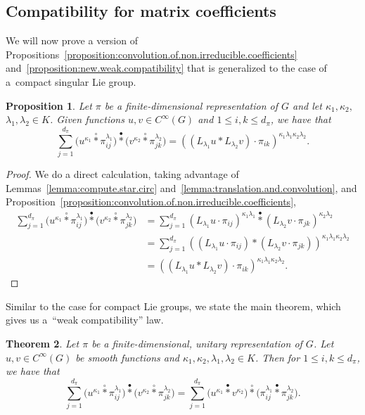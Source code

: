 \documentclass[10pt,a4paper]{amsart}
\numberwithin{equation}{section}
\newtheorem{Theorem}{Theorem}[section]
\newtheorem{Proposition}[Theorem]{Proposition}
\theoremstyle{definition}
\newcommand{\stardot}{\overset{{\bullet}}{*}}
\newcommand{\starcirc}{\overset{\circ}{*}}
\begin{document}
\subsection{Compatibility for matrix coefficients}
We will now prove a version of Propositions~\ref{proposition:convolution.of.non.irreducible.coefficients} and~\ref{proposition:new.weak.compatibility} that is generalized to the case of a~compact singular Lie group.
\begin{Proposition}\label{proposition:new.weak.compat}
   Let $ \pi $ be a finite-dimensional representation of $ G $ and let $ \kappa_1, \kappa_2,$ $\lambda_1, \lambda_2 \in K $. Given functions $ u, v \in C^\infty(G) $ and $ 1 \le i,k \le d_\pi $, we have that
  \[
   \sum_{j = 1}^{d_\pi} \big( u^{\kappa_1} \starcirc \pi_{ij}^{\lambda_1} \big) \stardot \big( v^{\kappa_2} \starcirc \pi_{jk}^{\lambda_2} \big) =  ( (L_{\lambda_1}u * L_{\lambda_2} v ) \cdot \pi_{ik} )^{\kappa_1 \lambda_1 \kappa_2 \lambda_2}.
  \]
\end{Proposition}
\begin{proof}
We do a direct calculation, taking advantage of Lemmas~\ref{lemma:compute.star.circ} and~\ref{lemma:translation.and.convolution}, and Proposition~\ref{proposition:convolution.of.non.irreducible.coefficients},
\begin{align*}
  \sum_{j = 1}^{d_\pi} \big( u^{\kappa_1} \starcirc \pi_{ij}^{\lambda_1} \big) \stardot \big( v^{\kappa_2} \starcirc \pi_{jk}^{\lambda_2} \big)
  &= \sum_{j = 1}^{d_\pi} ( L_{\lambda_1} u \cdot \pi_{ij})^{\kappa_1\lambda_1} \stardot ( L_{\lambda_2}
 v \cdot \pi_{jk} )^{\kappa_2 \lambda_2} \\
  &=\sum_{j=1}^{d_\pi} \left( (L_{\lambda_1} u \cdot \pi_{ij}) * (L_{\lambda_2} v \cdot \pi_{jk})\right)^{\kappa_1 \lambda_1 \kappa_2 \lambda_2} \\
  &= \left( (L_{\lambda_1} u * L_{\lambda_2} v ) \cdot \pi_{ik} \right)^{\kappa_1 \lambda_1 \kappa_2 \lambda_2 }.\tag*{\qed}
  \end{align*}\renewcommand{\qed}{}
\end{proof}

Similar to the case for compact Lie groups, we state the main theorem, which gives us a~``weak compatibility'' law.

\begin{Theorem}\label{theorem:new.main}
 Let $ \pi $ be a finite-dimensional, unitary representation of $ G $. Let $ u, v \in C^\infty(G) $ be smooth functions and $ \kappa_1, \kappa_2, \lambda_1, \lambda_2 \in K $. Then for
 $1 \le i,k \le d_{\pi} $, we have that
  \[
   \sum_{j = 1}^{d_\pi} \big( u^{\kappa_1} \starcirc \pi_{ij}^{\lambda_1} \big) \stardot \big( v^{\kappa_2} \starcirc \pi_{jk}^{\lambda_2} \big) =   \sum_{j = 1}^{d_\pi} \big( u^{\kappa_1} \stardot  v^{\kappa_2} \big) \starcirc \big(\pi_{ij}^{\lambda_1} \stardot \pi_{jk}^{\lambda_2} \big).
  \]
\end{Theorem}
\end{document}

